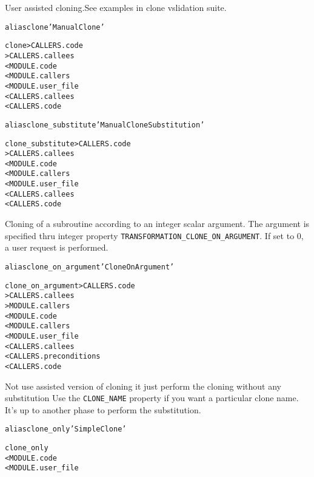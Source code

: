 \documentclass[a4paper]{report}
\newenvironment{PipsMake}{\begin{alltt}}{\end{alltt}}
\begin{document}
User assisted cloning.See examples in clone vslidation
suite. 
\begin{PipsMake}

alias clone 'Manual Clone'

clone                   > CALLERS.code
                        > CALLERS.callees
        < MODULE.code
        < MODULE.callers
        < MODULE.user_file
        < CALLERS.callees
        < CALLERS.code
\end{PipsMake}


\begin{PipsMake}
alias clone_substitute 'Manual Clone Substitution'

clone_substitute        > CALLERS.code
                        > CALLERS.callees
        < MODULE.code
        < MODULE.callers
        < MODULE.user_file
        < CALLERS.callees
        < CALLERS.code
\end{PipsMake}


Cloning of a subroutine according to an integer scalar argument.
The argument is specified thru integer property
\verb|TRANSFORMATION_CLONE_ON_ARGUMENT|. If set to $0$, a user request is
performed.

\begin{PipsMake}
alias clone_on_argument 'Clone On Argument'

clone_on_argument       > CALLERS.code
                        > CALLERS.callees
                        > MODULE.callers
        < MODULE.code
        < MODULE.callers
        < MODULE.user_file
        < CALLERS.callees
        < CALLERS.preconditions
        < CALLERS.code
\end{PipsMake}

Not use assisted version of cloning
it just perform the cloning without any substitution
Use the \lstinline|CLONE_NAME| property if you want a particular clone name.
It's up to another phase to perform the substitution.
\begin{PipsMake}

alias clone_only 'Simple Clone'

clone_only
        < MODULE.code
        < MODULE.user_file
\end{PipsMake}
\end{document}
